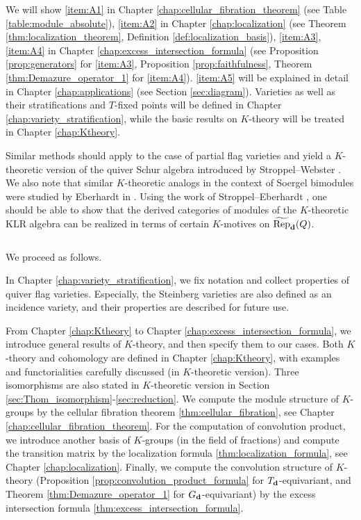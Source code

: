 We will show \eqref{item:A1} in Chapter \ref{chap:cellular_fibration_theorem} (see Table \ref{table:module_absolute}), \eqref{item:A2} in Chapter \ref{chap:localization} (see Theorem \ref{thm:localization_theorem}, Definition \ref{def:localization_basis}), \eqref{item:A3}, \eqref{item:A4} in Chapter \ref{chap:excess_intersection_formula} (see Proposition \ref{prop:generators} for \eqref{item:A3}, Proposition \ref{prop:faithfulness}, Theorem \ref{thm:Demazure_operator_1} for \eqref{item:A4}). \eqref{item:A5} will be explained in detail in Chapter \ref{chap:applications} (see Section \ref{sec:diagram}). Varieties as well as their stratifications and $T$-fixed points will be defined in Chapter \ref{chap:variety_stratification}, while the basic results on $K$-theory will be treated in Chapter \ref{chap:Ktheory}.

Similar methods should apply to the case of partial flag varieties and yield a $K$-theoretic version of the quiver Schur algebra introduced by Stroppel--Webster \cite{https://doi.org/10.48550/arxiv.1110.1115}. We also note that similar $K$-theoretic analogs in the context of Soergel bimodules were studied by Eberhardt in  \cite{Eberhardt2022Koszul,https://doi.org/10.48550/arxiv.2208.01665}. Using the work of Stroppel--Eberhardt \cite{https://doi.org/10.48550/arxiv.1110.1115}, one should be able to show that the derived categories of modules of the $K$-theoretic KLR algebra can be realized in terms of certain $K$-motives on $\operatorname{\widetilde{\operatorname{Rep}}}_{\mathbf{d}}(Q)$.

$\,$

We proceed as follows.

In Chapter \ref{chap:variety_stratification}, we fix notation and collect properties of quiver flag varieties. Especially, the Steinberg varieties are also defined as an incidence variety, and their properties are described for future use.

From Chapter \ref{chap:Ktheory} to Chapter \ref{chap:excess_intersection_formula}, we introduce general results of $K$-theory, and then specify them to our cases. Both $K$-theory and cohomology are defined in Chapter \ref{chap:Ktheory}, with examples and functorialities carefully discussed (in $K$-theoretic version). Three isomorphisms are also stated in $K$-theoretic version in Section \ref{sec:Thom_isomorphism}-\ref{sec:reduction}. We compute the module structure of $K$-groups by the cellular fibration theorem \ref{thm:cellular_fibration}, see Chapter \ref{chap:cellular_fibration_theorem}. For the computation of convolution product, we introduce another basis of $K$-groups (in the field of fractions) and compute the transition matrix by the localization formula \ref{thm:localization_formula}, see Chapter \ref{chap:localization}. Finally, we compute the convolution structure of $K$-theory (Proposition \ref{prop:convolution_product_formula} for $T_{\mathbf{d}}$-equivariant, and Theorem \ref{thm:Demazure_operator_1} for $G_{\mathbf{d}}$-equivariant) by the excess intersection formula \ref{thm:excess_intersection_formula}.

